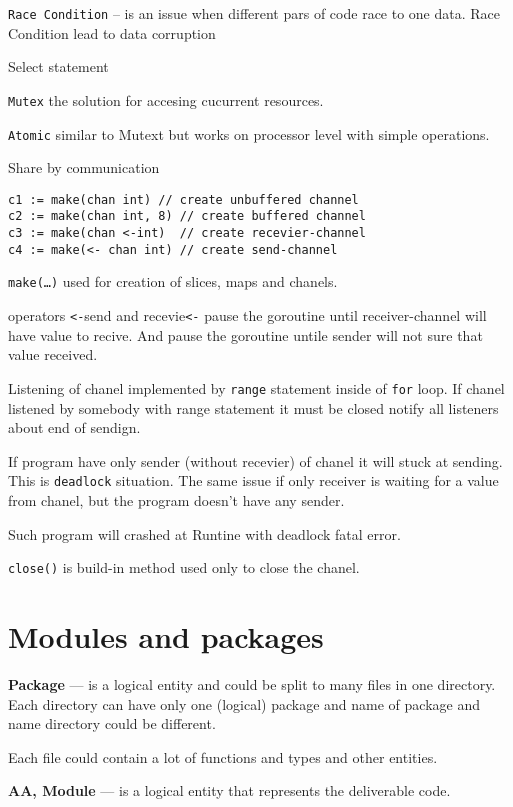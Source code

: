 \documentclass[12pt]{article}
\begin{document}
\texttt{Race Condition} -- is an issue when different pars of code race to one data.
Race Condition lead to data corruption

Select statement

\texttt{Mutex} the solution for accesing cucurrent resources.

\texttt{Atomic} similar to Mutext but works on processor level with simple operations.

Share by communication

\begin{lstlisting}
c1 := make(chan int) // create unbuffered channel
c2 := make(chan int, 8) // create buffered channel
c3 := make(chan <-int)  // create recevier-channel
c4 := make(<- chan int) // create send-channel
\end{lstlisting}

\texttt{make(\ldots)} used for creation of slices, maps and chanels.

operators \texttt{<-}send and recevie\texttt{<-} pause the goroutine until receiver-channel will have value to recive.
And pause the goroutine untile sender will not sure that value received.

Listening of chanel implemented by \texttt{range} statement inside of \texttt{for} loop.
If chanel listened by somebody with range statement it must be closed notify all listeners about end of sendign.

If program have only sender (without recevier) of chanel it will stuck at sending. This is \texttt{deadlock} situation.
The same issue if only receiver is waiting for a value from chanel, but the program doesn't have any sender.

Such program will crashed at Runtine with deadlock fatal error.

\texttt{close()} is build-in method used only to close the chanel.

\section{Modules and packages}

\textbf{Package} — is a logical entity and could be split to many files in one
directory.
Each directory can have only one (logical) package and name of
package and name directory could be different.

Each file could contain a lot of functions and types and other entities.


\textbf{AA, Module} — is a logical entity that represents the deliverable code.
\end{document}
